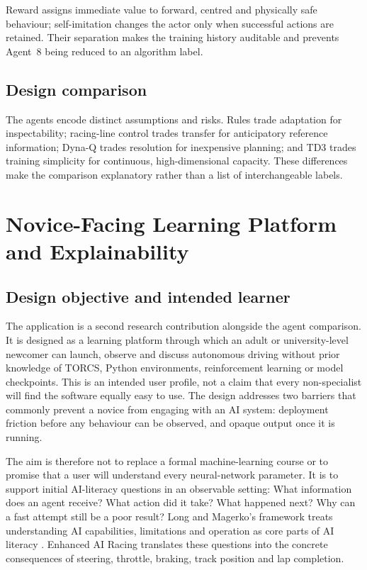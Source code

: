 Reward assigns immediate value to forward, centred and physically safe behaviour; self-imitation changes the actor only when successful actions are retained. Their separation makes the training history auditable and prevents Agent~8 being reduced to an algorithm label.

\subsection{Design comparison}

The agents encode distinct assumptions and risks. Rules trade adaptation for inspectability; racing-line control trades transfer for anticipatory reference information; Dyna-Q trades resolution for inexpensive planning; and TD3 trades training simplicity for continuous, high-dimensional capacity. These differences make the comparison explanatory rather than a list of interchangeable labels.

\section{Novice-Facing Learning Platform and Explainability}
\label{ch:telemetry-gui}

\subsection{Design objective and intended learner}

The application is a second research contribution alongside the agent comparison. It is designed as a learning platform through which an adult or university-level newcomer can launch, observe and discuss autonomous driving without prior knowledge of TORCS, Python environments, reinforcement learning or model checkpoints. This is an intended user profile, not a claim that every non-specialist will find the software equally easy to use. The design addresses two barriers that commonly prevent a novice from engaging with an AI system: deployment friction before any behaviour can be observed, and opaque output once it is running.

The aim is therefore not to replace a formal machine-learning course or to promise that a user will understand every neural-network parameter. It is to support initial AI-literacy questions in an observable setting: What information does an agent receive? What action did it take? What happened next? Why can a fast attempt still be a poor result? Long and Magerko's framework treats understanding AI capabilities, limitations and operation as core parts of AI literacy \parencite{long2020}. Enhanced AI Racing translates these questions into the concrete consequences of steering, throttle, braking, track position and lap completion.

